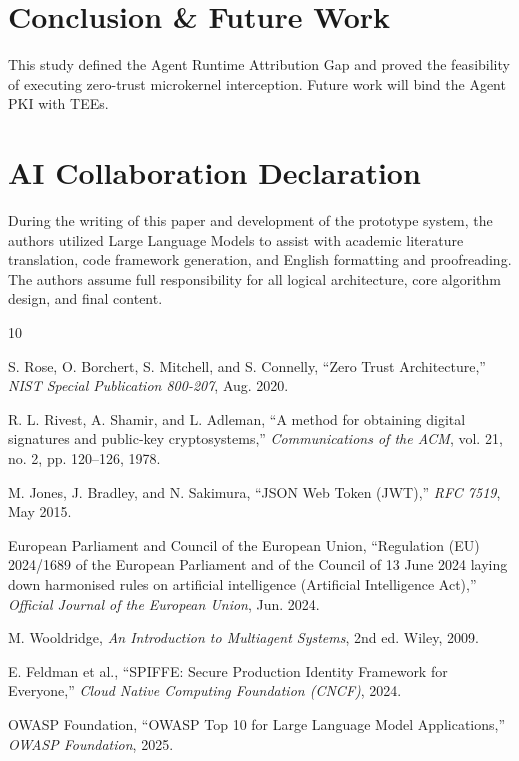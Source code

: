 \documentclass[conference]{IEEEtran}
\begin{document}
\section{Conclusion \& Future Work}
This study defined the Agent Runtime Attribution Gap and proved the feasibility of executing zero-trust microkernel interception. Future work will bind the Agent PKI with TEEs.

\section*{AI Collaboration Declaration}
During the writing of this paper and development of the prototype system, the authors utilized Large Language Models to assist with academic literature translation, code framework generation, and English formatting and proofreading. The authors assume full responsibility for all logical architecture, core algorithm design, and final content.

\begin{thebibliography}{10}

S. Rose, O. Borchert, S. Mitchell, and S. Connelly, ``Zero Trust Architecture,'' \emph{NIST Special Publication 800-207}, Aug. 2020.

R. L. Rivest, A. Shamir, and L. Adleman, ``A method for obtaining digital signatures and public-key cryptosystems,'' \emph{Communications of the ACM}, vol. 21, no. 2, pp. 120--126, 1978.

M. Jones, J. Bradley, and N. Sakimura, ``JSON Web Token (JWT),'' \emph{RFC 7519}, May 2015.

European Parliament and Council of the European Union, ``Regulation (EU) 2024/1689 of the European Parliament and of the Council of 13 June 2024 laying down harmonised rules on artificial intelligence (Artificial Intelligence Act),'' \emph{Official Journal of the European Union}, Jun. 2024.

M. Wooldridge, \emph{An Introduction to Multiagent Systems}, 2nd ed. Wiley, 2009.

E. Feldman et al., ``SPIFFE: Secure Production Identity Framework for Everyone,'' \emph{Cloud Native Computing Foundation (CNCF)}, 2024.

OWASP Foundation, ``OWASP Top 10 for Large Language Model Applications,'' \emph{OWASP Foundation}, 2025.

\end{thebibliography}
\end{document}
